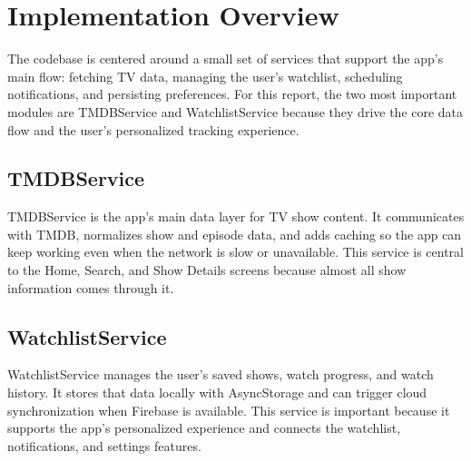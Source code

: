 \section{Implementation Overview}
The codebase is centered around a small set of services that support the app’s main flow: fetching TV data, managing the user’s watchlist, scheduling notifications, and persisting preferences. For this report, the two most important modules are TMDBService and WatchlistService because they drive the core data flow and the user’s personalized tracking experience.

\subsection{TMDBService}
TMDBService is the app’s main data layer for TV show content. It communicates with TMDB, normalizes show and episode data, and adds caching so the app can keep working even when the network is slow or unavailable. This service is central to the Home, Search, and Show Details screens because almost all show information comes through it.



\subsection{WatchlistService}
WatchlistService manages the user’s saved shows, watch progress, and watch history. It stores that data locally with AsyncStorage and can trigger cloud synchronization when Firebase is available. This service is important because it supports the app’s personalized experience and connects the watchlist, notifications, and settings features.

